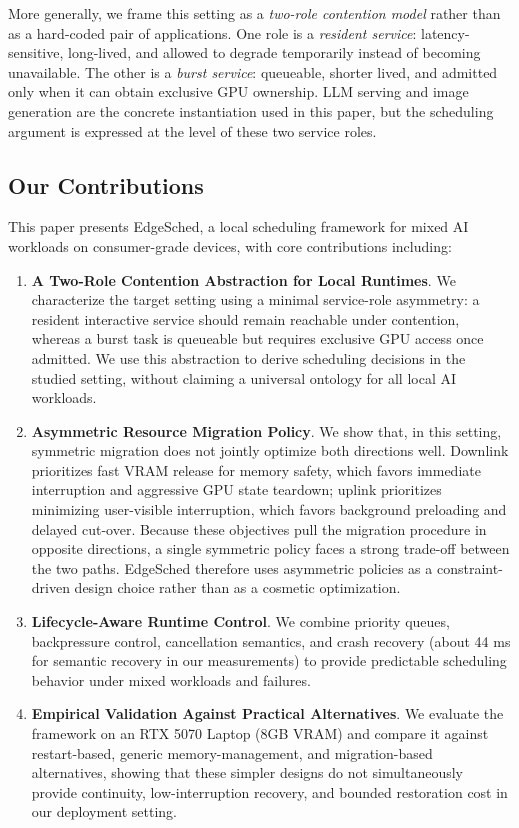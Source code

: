 More generally, we frame this setting as a \emph{two-role contention model} rather than as a hard-coded pair of applications. One role is a \emph{resident service}: latency-sensitive, long-lived, and allowed to degrade temporarily instead of becoming unavailable. The other is a \emph{burst service}: queueable, shorter lived, and admitted only when it can obtain exclusive GPU ownership. LLM serving and image generation are the concrete instantiation used in this paper, but the scheduling argument is expressed at the level of these two service roles.

\subsection{Our Contributions}

This paper presents EdgeSched, a local scheduling framework for mixed AI workloads on consumer-grade devices, with core contributions including:

\begin{enumerate}
\item \textbf{A Two-Role Contention Abstraction for Local Runtimes}. We characterize the target setting using a minimal service-role asymmetry: a resident interactive service should remain reachable under contention, whereas a burst task is queueable but requires exclusive GPU access once admitted. We use this abstraction to derive scheduling decisions in the studied setting, without claiming a universal ontology for all local AI workloads.

\item \textbf{Asymmetric Resource Migration Policy}. We show that, in this setting, symmetric migration does not jointly optimize both directions well. Downlink prioritizes fast VRAM release for memory safety, which favors immediate interruption and aggressive GPU state teardown; uplink prioritizes minimizing user-visible interruption, which favors background preloading and delayed cut-over. Because these objectives pull the migration procedure in opposite directions, a single symmetric policy faces a strong trade-off between the two paths. EdgeSched therefore uses asymmetric policies as a constraint-driven design choice rather than as a cosmetic optimization.

\item \textbf{Lifecycle-Aware Runtime Control}. We combine priority queues, backpressure control, cancellation semantics, and crash recovery (about 44 ms for semantic recovery in our measurements) to provide predictable scheduling behavior under mixed workloads and failures.

\item \textbf{Empirical Validation Against Practical Alternatives}. We evaluate the framework on an RTX 5070 Laptop (8GB VRAM) and compare it against restart-based, generic memory-management, and migration-based alternatives, showing that these simpler designs do not simultaneously provide continuity, low-interruption recovery, and bounded restoration cost in our deployment setting.
\end{enumerate}

